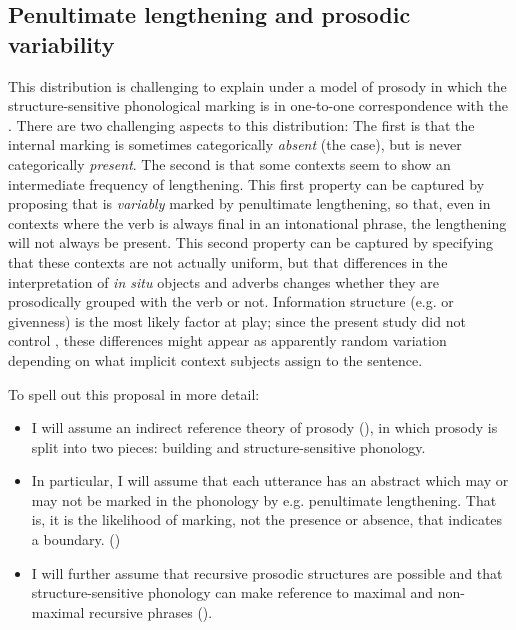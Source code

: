 \documentclass[output=paper 
,modfonts
,nonflat]{langsci/langscibook}
\begin{document}
\subsection{Penultimate lengthening and prosodic variability}

This distribution is challenging to explain under a model of prosody in which
the structure-sensitive phonological marking is in one-to-one correspondence
with the . There are two challenging aspects to this
distribution: The first is that the internal marking is sometimes categorically
\textit{absent} (the  case), but is never categorically
\textit{present}. The second is that some contexts seem to show an intermediate
frequency of lengthening. This first property can be captured by proposing that
 is \textit{variably} marked by penultimate lengthening, so
that, even in contexts where the verb is always final in an intonational
phrase, the lengthening will not always be present. This second property can be
captured by specifying that these contexts are not actually uniform, but that
differences in the interpretation of \textit{in situ} objects and adverbs
changes whether they are prosodically grouped with the verb or not. Information
structure (e.g.  or givenness) is the most likely factor at play; since the
present study did not control , these differences might
appear as apparently random variation depending on what implicit context
subjects assign to the sentence.

To spell out this proposal in more detail:

\begin{itemize}

	\item I will assume an indirect reference theory of prosody
		(\citealt{Selkirk11}),
		in which prosody is split into two pieces:  building
		and structure-sensitive phonology.

	\item In particular, I will assume that each utterance has an abstract
		 which may or may not be marked in the phonology by
		e.g. penultimate lengthening. That is, it is the likelihood of marking,
		not the presence or absence, that indicates a boundary.
		(\citealt{Elfner2016})

	\item I will further assume that recursive prosodic structures are possible
		and that structure-sensitive phonology can make reference to maximal
		and non-maximal recursive phrases (\citealt{ItoMester12}). 
\end{itemize}
\end{document}
